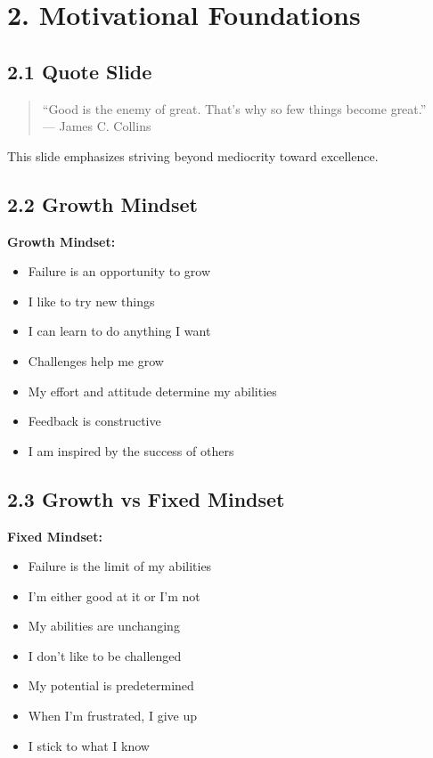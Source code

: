 \documentclass[11pt]{article}
\begin{document}
\section*{2. Motivational Foundations}

\subsection*{2.1 Quote Slide}

\begin{quote}
“Good is the enemy of great. That’s why so few things become great.”\\
— James C. Collins
\end{quote}

This slide emphasizes striving beyond mediocrity toward excellence.

\subsection*{2.2 Growth Mindset}

\textbf{Growth Mindset:}

\begin{itemize}
    \item Failure is an opportunity to grow
    \item I like to try new things
    \item I can learn to do anything I want
    \item Challenges help me grow
    \item My effort and attitude determine my abilities
    \item Feedback is constructive
    \item I am inspired by the success of others
\end{itemize}

\subsection*{2.3 Growth vs Fixed Mindset}

\textbf{Fixed Mindset:}

\begin{itemize}
    \item Failure is the limit of my abilities
    \item I’m either good at it or I’m not
    \item My abilities are unchanging
    \item I don’t like to be challenged
    \item My potential is predetermined
    \item When I’m frustrated, I give up
    \item I stick to what I know
\end{itemize}
\end{document}
